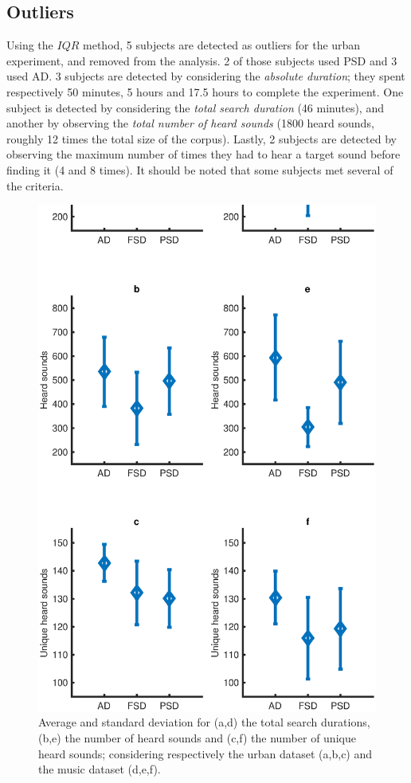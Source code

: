 \documentclass{aes2e}
\begin{document}
\subsection{Outliers}

Using the $IQR$ method, 5 subjects are detected as outliers for the urban experiment, and removed from the analysis. 2 of those subjects used PSD and 3 used AD. 3 subjects are detected by considering the \textit{absolute duration}; they spent respectively 50 minutes, 5 hours and 17.5 hours to complete the experiment. One subject is detected by considering the \textit{total search duration} (46 minutes), and another by observing the \textit{total number of heard sounds} (1800 heard sounds, roughly 12 times the total size of the corpus). Lastly, 2 subjects are detected by observing the maximum number of times they had to hear a target sound before finding it (4 and 8 times). It should be noted that some subjects met several of the criteria.

\begin{figure}[t]
\begin{center}
\includegraphics[width=\columnwidth]{gfx/urbanMusic1.eps} 
\end{center}
\caption{\label{urbanMusic} Average and standard deviation for (a,d) the total search durations, (b,e) the number of heard sounds and (c,f) the number of unique heard sounds; considering respectively the urban dataset (a,b,c) and the music dataset (d,e,f).}
\end{figure}  
\end{document}
